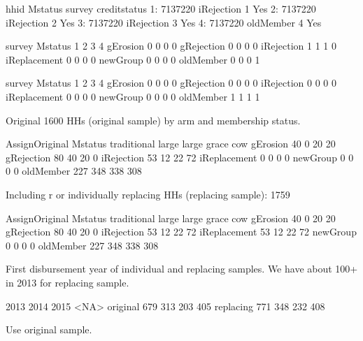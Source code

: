 \begin{Schunk}
\begin{Soutput}
      hhid    Mstatus survey creditstatus
1: 7137220 iRejection      1          Yes
2: 7137220 iRejection      2          Yes
3: 7137220 iRejection      3          Yes
4: 7137220  oldMember      4          Yes
\end{Soutput}
\begin{Soutput}
              survey
Mstatus        1 2 3 4
  gErosion     0 0 0 0
  gRejection   0 0 0 0
  iRejection   1 1 1 0
  iReplacement 0 0 0 0
  newGroup     0 0 0 0
  oldMember    0 0 0 1
\end{Soutput}
\begin{Soutput}
              survey
Mstatus        1 2 3 4
  gErosion     0 0 0 0
  gRejection   0 0 0 0
  iRejection   0 0 0 0
  iReplacement 0 0 0 0
  newGroup     0 0 0 0
  oldMember    1 1 1 1
\end{Soutput}
\end{Schunk}
Original 1600 HHs (original sample) by arm and membership status.
\begin{Schunk}
\begin{Soutput}
              AssignOriginal
Mstatus        traditional large large grace cow
  gErosion              40     0          20  20
  gRejection            80    40          20   0
  iRejection            53    12          22  72
  iReplacement           0     0           0   0
  newGroup               0     0           0   0
  oldMember            227   348         338 308
\end{Soutput}
\end{Schunk}
Including \textsf{r} or individually replacing HHs (replacing sample): 1759
\begin{Schunk}
\begin{Soutput}
              AssignOriginal
Mstatus        traditional large large grace cow
  gErosion              40     0          20  20
  gRejection            80    40          20   0
  iRejection            53    12          22  72
  iReplacement          53    12          22  72
  newGroup               0     0           0   0
  oldMember            227   348         338 308
\end{Soutput}
\end{Schunk}
First disbursement year of individual and replacing samples. We have about 100+ in 2013 for replacing sample.
\begin{Schunk}
\begin{Soutput}
          2013 2014 2015 <NA>
original   679  313  203  405
replacing  771  348  232  408
\end{Soutput}
\end{Schunk}
Use original sample. \gobblepars

